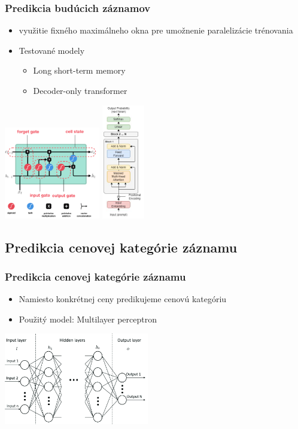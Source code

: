 \documentclass[slovak]{beamer}
\begin{document}
\begin{frame}
	\frametitle{Predikcia budúcich záznamov}
	\begin{itemize}
		\item<1> využitie fixného maximálneho okna pre umožnenie paralelizácie trénovania
		\item<1> Testované modely
		 \begin{itemize}
		 	\item<1> Long short-term memory
		 	\item<1> Decoder-only transformer
		 \end{itemize}
	\end{itemize}
	\begin{center}
		\includegraphics[height=4cm]{images/LSTM_arch.png}
		\includegraphics[height=5cm]{images/decod_only_trans_arch.png}
	\end{center}
\end{frame}

\subsection{Predikcia cenovej kategórie záznamu}

\begin{frame}
	\frametitle{Predikcia cenovej kategórie záznamu}
	\begin{itemize}
		\item<1> Namiesto konkrétnej ceny predikujeme cenovú kategóriu
		\item<1> Použitý model: Multilayer perceptron
	\end{itemize}
	\begin{center}
		\includegraphics[height=4cm]{images/MLP_arch.png}
	\end{center}
\end{frame}
\end{document}
